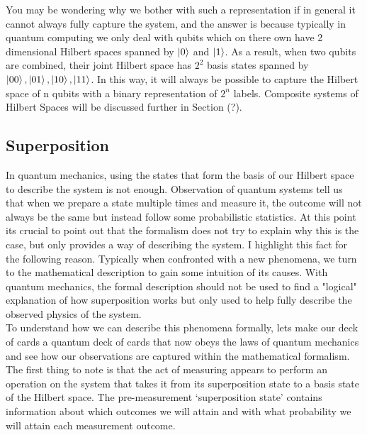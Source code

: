 You may be wondering why we bother with such a representation if in general it cannot always fully capture the system, and the answer is because typically in quantum computing we only deal with qubits which on there own have 2 dimensional Hilbert spaces spanned by $\left\vert{0}\right\rangle$ and $\left\vert{1}\right\rangle$. As a result, when two qubits are combined, their joint Hilbert space has $2^2$ basis states spanned by ${\left\vert{00}\right\rangle, \left\vert{01}\right\rangle, \left\vert{10}\right\rangle, \left\vert{11}\right\rangle}$. In this way, it will always be possible to capture the Hilbert space of n qubits with a binary representation of $2^n$ labels. Composite systems of Hilbert Spaces will be discussed further in Section (?).

\subsection{Superposition}

In quantum mechanics, using the states that form the basis of our Hilbert space to describe the system is not enough. Observation of quantum systems tell us that when we prepare a state multiple times and measure it, the outcome will not always be the same but instead follow some probabilistic statistics. At this point its crucial to point out that the formalism does not try to explain why this is the case, but only provides a way of describing the system. I highlight this fact for the following reason. Typically when confronted with a new phenomena, we turn to the mathematical description to gain some intuition of its causes. With quantum mechanics, the formal description should not be used to find a "logical" explanation of how superposition works but only used to help fully describe the observed physics of the system.\\

To understand how we can describe this phenomena formally, lets make our deck of cards a quantum deck of cards that now obeys the laws of quantum mechanics and see how our observations are captured within the mathematical formalism.\\

The first thing to note is that the act of measuring appears to perform an operation on the system that takes it from its superposition state to a basis state of the Hilbert space. The pre-measurement `superposition state' contains information about which outcomes we will attain and with what probability we will attain each measurement outcome.\\

